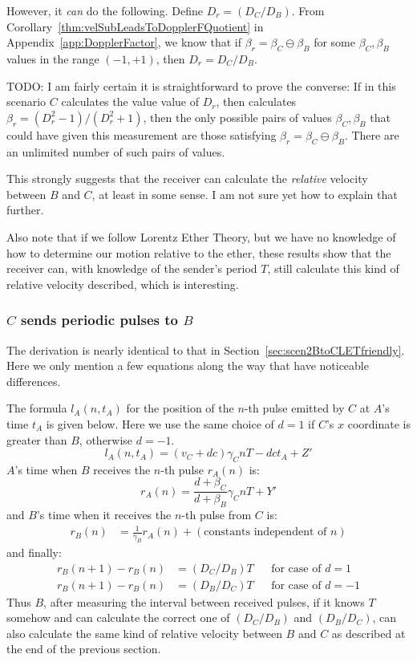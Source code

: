 \documentclass[a4paper]{article}
\theoremstyle{plain}
\theoremstyle{definition}
\begin{document}
However, it {\em can} do the following.  Define $D_r = (D_C / D_B)$.
From Corollary~\ref{thm:velSubLeadsToDopplerFQuotient} in
Appendix~\ref{app:DopplerFactor}, we know that if
$\beta_r = \beta_C \ominus \beta_B$ for some $\beta_C, \beta_B$ values
in the range $(-1, +1)$, then $D_r = D_C / D_B$.

TODO: I am fairly certain it is straightforward to prove the converse:
If in this scenario $C$ calculates the value value of $D_r$, then
calculates $\beta_r = (D_r^2-1)/(D_r^2+1)$, then the only possible
pairs of values $\beta_C, \beta_B$ that could have given this
measurement are those satisfying $\beta_r = \beta_C \ominus \beta_B$.
There are an unlimited number of such pairs of values.

This strongly suggests that the receiver can calculate the
{\em relative} velocity between $B$ and $C$, at least in some sense.
I am not sure yet how to explain that further.

Also note that if we follow Lorentz Ether Theory, but we have no
knowledge of how to determine our motion relative to the ether, these
results show that the receiver can, with knowledge of the sender's
period $T$, still calculate this kind of relative velocity described,
which is interesting.


\subsubsection{$C$ sends periodic pulses to $B$}
\label{sec:scen2CtoBLETfriendly}

The derivation is nearly identical to that in
Section~\ref{sec:scen2BtoCLETfriendly}.
Here we only mention a few equations along the way that have
noticeable differences.

The formula $l_A(n,t_A)$ for the position of the $n$-th pulse emitted
by $C$ at $A$'s time $t_A$ is given below.
Here we use the same choice of $d=1$ if $C$'s $x$ coordinate is
greater than $B$, otherwise $d=-1$.
\begin{equation}
l_A(n, t_A) = (v_C + dc) \gamma_C nT - dc t_A + Z'
\end{equation}
$A$'s time when $B$ receives the $n$-th pulse $r_A(n)$ is:
\begin{equation}
r_A(n) = \frac{d + \beta_C}{d + \beta_B} \gamma_C nT + Y'
\end{equation}
and $B$'s time when it receives the $n$-th pulse from $C$ is:
\begin{align*}
r_B(n) & = \frac{1}{\gamma_B} r_A(n) + (\text{constants independent of $n$})
\end{align*}
and finally:
\begin{align*}
r_B(n+1) - r_B(n)
       & = ( D_C / D_B ) T & & \text{for case of $d=1$} \\
r_B(n+1) - r_B(n)
       & = ( D_B / D_C ) T & & \text{for case of $d=-1$}
\end{align*}
Thus $B$, after measuring the interval between received pulses, if it
knows $T$ somehow and can calculate the correct one of $(D_C / D_B)$
and $(D_B / D_C)$, can also calculate the same kind of relative
velocity between $B$ and $C$ as described at the end of the previous
section.
\end{document}
